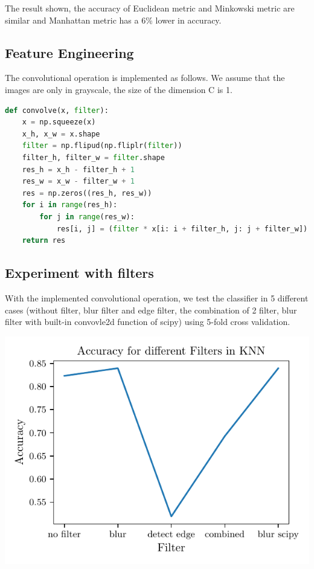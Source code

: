 \documentclass[11pt]{article}
\begin{document}
The result shown, the accuracy of Euclidean metric and Minkowski metric are similar and Manhattan metric has a 6\% lower in accuracy.

\subsection{Feature Engineering}

The convolutional operation is implemented as follows. We assume that the images are only in grayscale, the size of the dimension C is 1.

\begin{lstlisting}[language=python, caption=convolve function]
def convolve(x, filter):
    x = np.squeeze(x)
    x_h, x_w = x.shape
    filter = np.flipud(np.fliplr(filter))
    filter_h, filter_w = filter.shape
    res_h = x_h - filter_h + 1
    res_w = x_w - filter_w + 1
    res = np.zeros((res_h, res_w))
    for i in range(res_h):
        for j in range(res_w):
            res[i, j] = (filter * x[i: i + filter_h, j: j + filter_w]).sum()
    return res
\end{lstlisting}

\subsection{Experiment with filters}

With the implemented convolutional operation, we test the classifier in 5 different cases (without filter, blur filter and edge filter, the combination of 2 filter, blur filter with built-in convovle2d function of scipy) using 5-fold cross validation.

\includegraphics{figures/1g_knn_acc_filter.pdf}
\end{document}
